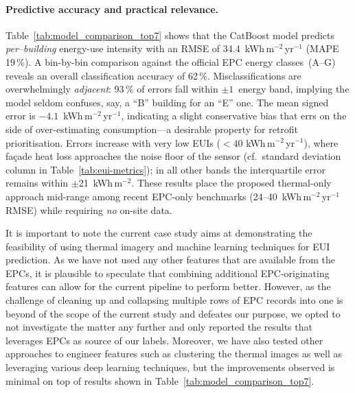 \documentclass[preprint,12pt]{elsarticle}
\begin{document}
    \paragraph{Predictive accuracy and practical relevance.} Table~\ref{tab:model_comparison_top7} shows that the CatBoost model predicts \emph{per–building} energy-use intensity with an RMSE of 34.4~kWh\,m$^{-2}$\,yr$^{-1}$ (MAPE 19\,\%). A bin-by-bin comparison against the official EPC energy classes~(A--G) reveals an overall classification accuracy of 62\,\%. Misclassifications are overwhelmingly \emph{adjacent}: 93\,\% of errors fall within $\pm1$~energy band, implying the model seldom confuses, say, a ``B'' building for an ``E'' one. The mean signed error is $-4.1$~kWh\,m$^{-2}$\,yr$^{-1}$, indicating a slight conservative bias that errs on the side of over-estimating consumption---a desirable property for retrofit prioritisation.  Errors increase with very low EUIs ($<40$ kWh\,m$^{-2}$\,yr$^{-1}$), where façade heat loss approaches the noise floor of the sensor (cf.\ standard deviation column in Table~\ref{tab:eui-metrics}); in all other bands the interquartile error remains within $\pm$21~kWh\,m$^{-2}$. These results place the proposed thermal-only approach mid-range among recent EPC-only benchmarks (24--40~kWh\,m$^{-2}$\,yr$^{-1}$ RMSE) while requiring \emph{no} on-site data.

    It is important to note the current case study aims at demonstrating the feasibility of using thermal imagery and machine learning techniques for EUI prediction. As we have not used any other features that are available from the EPCs, it is plausible to speculate that combining additional EPC-originating features can allow for the current pipeline to perform better. However, as the challenge of cleaning up and collapsing multiple rows of EPC records into one is beyond of the scope of the current study and defeates our purpose, we opted to not investigate the matter any further and only reported the results that leverages EPCs as source of our labels. Moreover, we have also tested other approaches to engineer features such as clustering the thermal images as well as leveraging various deep learning techniques, but the improvements observed is minimal on top of results shown in Table~\ref{tab:model_comparison_top7}.%
\end{document}
